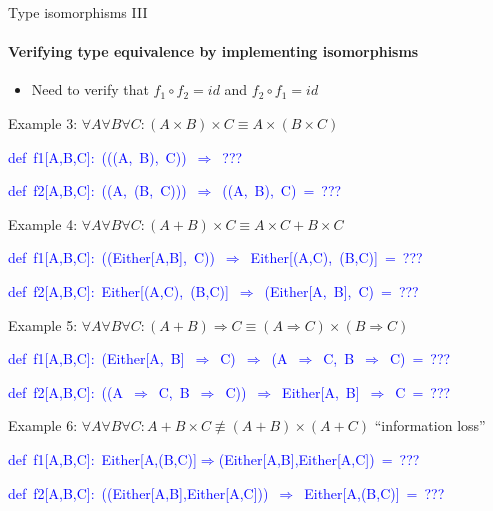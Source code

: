 \documentclass[english]{beamer}
\newenvironment{lyxcode}
   {\par\begin{list}{}{
     \setlength{\rightmargin}{\leftmargin}
     \setlength{\listparindent}{0pt}%
     \raggedright
     \setlength{\itemsep}{0pt}
     \setlength{\parsep}{0pt}
     \normalfont\ttfamily}%
    \def\{{\char`\{}
    \def\}{\char`\}}
    \def\textasciitilde{\char`\~}
    \item[]}
   {\end{list}}
\begin{document}
\begin{frame}{Type isomorphisms III}


\framesubtitle{Verifying type equivalence by implementing isomorphisms}
\begin{itemize}
\item Need to verify that $f_{1}\circ f_{2}=id$ and $f_{2}\circ f_{1}=id$
\end{itemize}
Example 3: $\forall A\forall B\forall C:(A\times B)\times C\equiv A\times(B\times C)$
\begin{lyxcode}
\textcolor{blue}{\footnotesize{}def~f1{[}A,B,C{]}:~(((A,~B),~C))~$\Rightarrow$~???}{\footnotesize \par}

\textcolor{blue}{\footnotesize{}def~f2{[}A,B,C{]}:~((A,~(B,~C)))~$\Rightarrow$~((A,~B),~C)~=~???}{\footnotesize \par}
\end{lyxcode}
Example 4: $\forall A\forall B\forall C:(A+B)\times C\equiv A\times C+B\times C$
\begin{lyxcode}
\textcolor{blue}{\footnotesize{}def~f1{[}A,B,C{]}:~((Either{[}A,B{]},~C))~$\Rightarrow$~Either{[}(A,C),~(B,C){]}~=~???}{\footnotesize \par}

\textcolor{blue}{\footnotesize{}def~f2{[}A,B,C{]}:~Either{[}(A,C),~(B,C){]}~$\Rightarrow$~(Either{[}A,~B{]},~C)~=~???}{\footnotesize \par}
\end{lyxcode}
Example 5: $\forall A\forall B\forall C:(A+B)\Rightarrow C\equiv(A\Rightarrow C)\times(B\Rightarrow C)$
\begin{lyxcode}
\textcolor{blue}{\footnotesize{}def~f1{[}A,B,C{]}:~(Either{[}A,~B{]}~$\Rightarrow$~C)~$\Rightarrow$~(A~$\Rightarrow$~C,~B~$\Rightarrow$~C)~=~???}{\footnotesize \par}

\textcolor{blue}{\footnotesize{}def~f2{[}A,B,C{]}:~((A~$\Rightarrow$~C,~B~$\Rightarrow$~C))~$\Rightarrow$~Either{[}A,~B{]}~$\Rightarrow$~C~=~???}{\footnotesize \par}
\end{lyxcode}
Example 6: $\forall A\forall B\forall C:A+B\times C\not\equiv(A+B)\times(A+C)$
\textendash{} ``information loss''
\begin{lyxcode}
\textcolor{blue}{\footnotesize{}def~f1{[}A,B,C{]}:~Either{[}A,(B,C){]}$\Rightarrow$(Either{[}A,B{]},Either{[}A,C{]})~=~???}{\footnotesize \par}

\textcolor{blue}{\footnotesize{}def~f2{[}A,B,C{]}:~((Either{[}A,B{]},Either{[}A,C{]}))~$\Rightarrow$~Either{[}A,(B,C){]}~=~???}{\footnotesize \par}
\end{lyxcode}
\end{frame}
\end{document}
